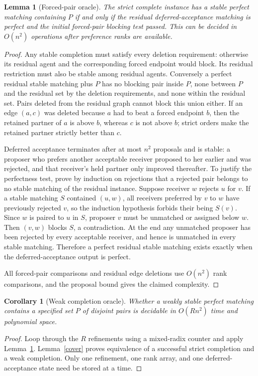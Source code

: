 \documentclass[11pt]{article}
\newtheorem{lemma}[theorem]{Lemma}
\newtheorem{corollary}[theorem]{Corollary}
\theoremstyle{remark}
\begin{document}
\begin{lemma}[Forced-pair oracle]\label{forced}
The strict complete instance has a stable perfect matching containing
$P$ if and only if the residual deferred-acceptance matching is perfect
and the initial forced-pair blocking test passed. This can be decided
in $O(n^2)$ operations after preference ranks are available.
\end{lemma}
\begin{proof}
Any stable completion must satisfy every deletion requirement: otherwise
its residual agent and the corresponding forced endpoint would block.
Its residual restriction must also be stable among residual agents.
Conversely a perfect residual stable matching plus $P$ has no blocking
pair inside $P$, none between $P$ and the residual set by the deletion
requirements, and none within the residual set. Pairs deleted from the
residual graph cannot block this union either. If an edge $(a,c)$ was
deleted because $a$ had to beat a forced endpoint $b$, then the retained
partner of $a$ is above $b$, whereas $c$ is not above $b$; strict orders
make the retained partner strictly better than $c$.

Deferred acceptance terminates after at most $n^2$ proposals and is
stable: a proposer who prefers another acceptable receiver proposed to
her earlier and was rejected, and that receiver's held partner only
improved thereafter. To justify the perfectness test, prove by induction
on rejections that a rejected pair belongs to no stable matching of the
residual instance. Suppose receiver $w$ rejects $u$ for $v$. If a stable
matching $S$ contained $(u,w)$, all receivers preferred by $v$ to $w$
have previously rejected $v$, so the induction hypothesis forbids their
being $S(v)$. Since $w$ is paired to $u$ in $S$, proposer $v$ must be
unmatched or assigned below $w$. Then $(v,w)$ blocks $S$, a
contradiction. At the end any unmatched proposer has been rejected by
every acceptable receiver, and hence is unmatched in every stable
matching. Therefore a perfect residual stable matching exists exactly
when the deferred-acceptance output is perfect.

All forced-pair comparisons and residual edge deletions use $O(n^2)$
rank comparisons, and the proposal bound gives the claimed complexity.
\end{proof}

\begin{corollary}[Weak completion oracle]\label{weakoracle}
Whether a weakly stable perfect matching contains a specified set $P$
of disjoint pairs is decidable in $O(R n^2)$ time and polynomial space.
\end{corollary}
\begin{proof}
Loop through the $R$ refinements using a mixed-radix counter and apply
Lemma~\ref{forced}. Lemma~\ref{cover} proves equivalence of a successful
strict completion and a weak completion. Only one refinement, one rank
array, and one deferred-acceptance state need be stored at a time.
\end{proof}
\end{document}
